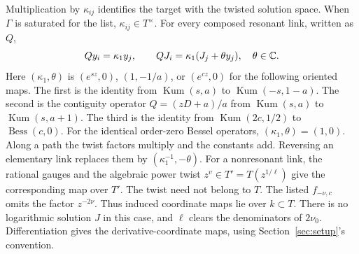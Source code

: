 Multiplication by $\kappa_{ij}$ identifies the target with the twisted
solution space. When $\Gamma$ is saturated for the list,
$\kappa_{ij}\in T^\times$. For every composed resonant link, written as $Q$,
\begin{equation}\label{eq:link-composed}
 Qy_i=\kappa_1y_j,\qquad QJ_i=\kappa_1(J_j+\theta y_j),\quad\theta\in\mathbb{C}.
\end{equation}
Here $(\kappa_1,\theta)$ is $(e^{sz},0)$, $(1,-1/a)$, or
$(e^{cz},0)$ for the following oriented maps. The first is the identity from
$\operatorname{Kum}(s,a)$ to $\operatorname{Kum}(-s,1-a)$.
The second is the contiguity operator $Q=(zD+a)/a$ from $\operatorname{Kum}(s,a)$ to
$\operatorname{Kum}(s,a+1)$. The third is the identity from
$\operatorname{Kum}(2c,1/2)$ to $\operatorname{Bess}(c,0)$.
For the identical order-zero Bessel operators, $(\kappa_1,\theta)=(1,0)$.
Along a path the twist factors multiply and the constants add. Reversing
an elementary link replaces them by $(\kappa_1^{-1},-\theta)$.
For a nonresonant link, the rational gauges and the algebraic power twist
$z^\upsilon\in T'=T(z^{1/\ell})$ give the corresponding map over $T'$. The twist need not belong to $T$. The listed $f_{-\nu,c}$ omits the
factor $z^{-2\nu}$. Thus induced coordinate maps lie over $k\subset T$.
There is no logarithmic solution $J$
in this case, and $\ell$ clears the denominators of $2\nu_0$.
Differentiation gives the derivative-coordinate maps, using Section~\ref{sec:setup}'s convention.
